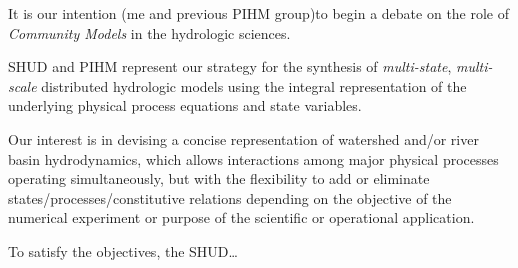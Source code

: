 \documentclass[]{scrbook}
\begin{document}
It is our intention (me and previous PIHM group)to begin a debate on the
role of \emph{Community Models} in the hydrologic sciences.

SHUD and PIHM represent our strategy for the synthesis of
\emph{multi-state}, \emph{multi-scale} distributed hydrologic models
using the integral representation of the underlying physical process
equations and state variables.

Our interest is in devising a concise representation of watershed and/or
river basin hydrodynamics, which allows interactions among major
physical processes operating simultaneously, but with the flexibility to
add or eliminate states/processes/constitutive relations depending on
the objective of the numerical experiment or purpose of the scientific
or operational application.

To satisfy the objectives, the SHUD\ldots{}
\end{document}
